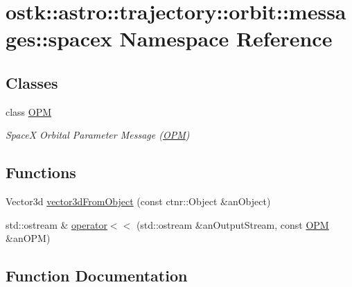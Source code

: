 \hypertarget{namespaceostk_1_1astro_1_1trajectory_1_1orbit_1_1messages_1_1spacex}{}\section{ostk\+:\+:astro\+:\+:trajectory\+:\+:orbit\+:\+:messages\+:\+:spacex Namespace Reference}
\label{namespaceostk_1_1astro_1_1trajectory_1_1orbit_1_1messages_1_1spacex}
\subsection*{Classes}
\begin{DoxyCompactItemize}
\item 
class \hyperlink{classostk_1_1astro_1_1trajectory_1_1orbit_1_1messages_1_1spacex_1_1_o_p_m}{O\+PM}
\begin{DoxyCompactList}\small\item\em SpaceX Orbital Parameter Message (\hyperlink{classostk_1_1astro_1_1trajectory_1_1orbit_1_1messages_1_1spacex_1_1_o_p_m}{O\+PM}) \end{DoxyCompactList}\end{DoxyCompactItemize}
\subsection*{Functions}
\begin{DoxyCompactItemize}
\item 
Vector3d \hyperlink{namespaceostk_1_1astro_1_1trajectory_1_1orbit_1_1messages_1_1spacex_a446464b600a98d6f017ec719fe302350}{vector3d\+From\+Object} (const ctnr\+::\+Object \&an\+Object)
\item 
std\+::ostream \& \hyperlink{namespaceostk_1_1astro_1_1trajectory_1_1orbit_1_1messages_1_1spacex_ae93496327f09266a614f279f3609bd8a}{operator$<$$<$} (std\+::ostream \&an\+Output\+Stream, const \hyperlink{classostk_1_1astro_1_1trajectory_1_1orbit_1_1messages_1_1spacex_1_1_o_p_m}{O\+PM} \&an\+O\+PM)
\end{DoxyCompactItemize}


\subsection{Function Documentation}
\mbox{\label{namespaceostk_1_1astro_1_1trajectory_1_1orbit_1_1messages_1_1spacex_ae93496327f09266a614f279f3609bd8a}} 
